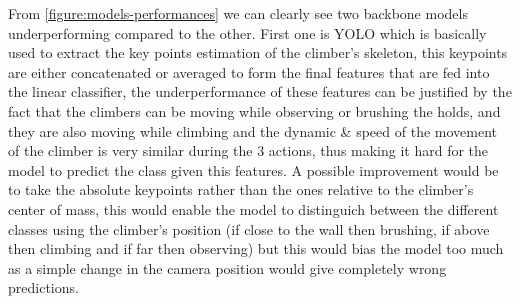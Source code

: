 



From \ref{figure:models-performances} we can clearly see two backbone models underperforming compared to the other. First one is YOLO which is basically used to extract the key points estimation of the climber's skeleton, this keypoints are either concatenated or averaged to form the final features that are fed into the linear classifier, the underperformance of these features can be justified by the fact that the climbers can be moving while observing or brushing the holds, and they are also moving while climbing and the dynamic \& speed of the movement of the climber is very similar during the 3 actions, thus making it hard for the model to predict the class given this features. A possible improvement would be to take the absolute keypoints rather than the ones relative to the climber's center of mass, this would enable the model to distinguich between the different classes using the climber's position (if close to the wall then brushing, if above then climbing and if far then observing) but this would bias the model too much as a simple change in the camera position would give completely wrong predictions. 

